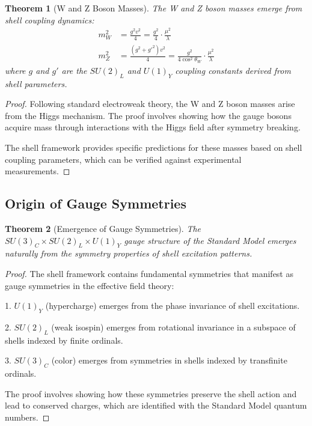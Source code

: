 \documentclass[12pt,a4paper]{article}
\newtheorem{theorem}{Theorem}[section]
\begin{document}
\begin{theorem}[W and Z Boson Masses]
\label{thm:gauge-boson-masses}
The W and Z boson masses emerge from shell coupling dynamics:
\begin{align}
m_W^2 &= \frac{g^2 v^2}{4} = \frac{g^2}{4} \cdot \frac{\mu^2}{\lambda} \\
m_Z^2 &= \frac{(g^2 + g'^2) v^2}{4} = \frac{g^2}{4\cos^2\theta_W} \cdot \frac{\mu^2}{\lambda}
\end{align}
where $g$ and $g'$ are the $SU(2)_L$ and $U(1)_Y$ coupling constants derived from shell parameters.
\end{theorem}

\begin{proof}
Following standard electroweak theory, the W and Z boson masses arise from the Higgs mechanism. The proof involves showing how the gauge bosons acquire mass through interactions with the Higgs field after symmetry breaking.

The shell framework provides specific predictions for these masses based on shell coupling parameters, which can be verified against experimental measurements.
\end{proof}

\subsection{Origin of Gauge Symmetries}
\label{subsec:gauge-symmetries}

\begin{theorem}[Emergence of Gauge Symmetries]
\label{thm:gauge-emergence}
The $SU(3)_C \times SU(2)_L \times U(1)_Y$ gauge structure of the Standard Model emerges naturally from the symmetry properties of shell excitation patterns.
\end{theorem}

\begin{proof}
The shell framework contains fundamental symmetries that manifest as gauge symmetries in the effective field theory:

1. $U(1)_Y$ (hypercharge) emerges from the phase invariance of shell excitations.

2. $SU(2)_L$ (weak isospin) emerges from rotational invariance in a subspace of shells indexed by finite ordinals.

3. $SU(3)_C$ (color) emerges from symmetries in shells indexed by transfinite ordinals.

The proof involves showing how these symmetries preserve the shell action and lead to conserved charges, which are identified with the Standard Model quantum numbers.
\end{proof}
\end{document}
